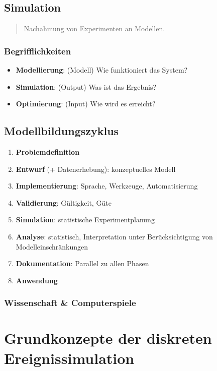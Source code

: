 \documentclass{article}
\begin{document}
\subsection{Simulation}
\begin{quote}Nachahmung von Experimenten an Modellen.\end{quote}



\subsubsection{Begrifflichkeiten}
\begin{itemize}
  \item \textbf{Modellierung}: (Modell) Wie funktioniert das System?
  \item \textbf{Simulation}: (Output) Was ist das Ergebnis?
  \item \textbf{Optimierung}: (Input) Wie wird es erreicht?
\end{itemize}

\subsection{Modellbildungszyklus}
\begin{enumerate}
  \item \textbf{Problemdefinition}
  \item \textbf{Entwurf} (+ Datenerhebung): konzeptuelles Modell
  \item \textbf{Implementierung}: Sprache, Werkzeuge, Automatisierung
  \item \textbf{Validierung}: Gültigkeit, Güte
  \item \textbf{Simulation}: statistische Experimentplanung
  \item \textbf{Analyse}: statistisch, Interpretation unter Berücksichtigung von Modelleinschränkungen
  \item \textbf{Dokumentation}: Parallel zu allen Phasen
  \item \textbf{Anwendung}
\end{enumerate}

\subsubsection{Wissenschaft \& Computerspiele}


\section{Grundkonzepte der diskreten Ereignissimulation}
\end{document}
